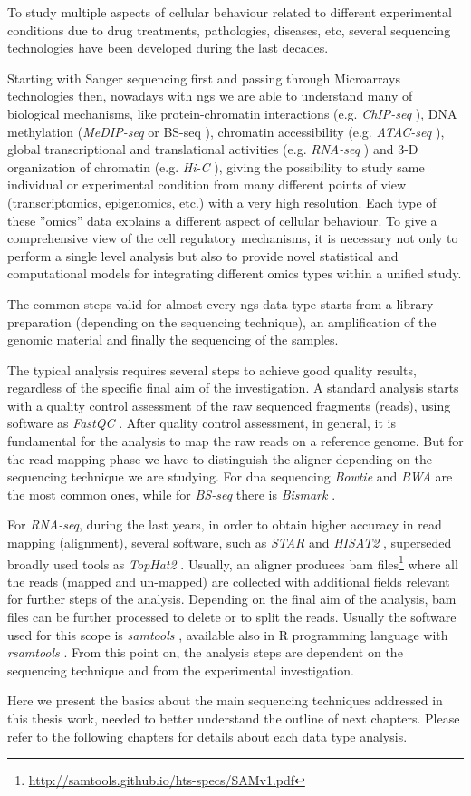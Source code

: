 To study multiple aspects of cellular behaviour related to different experimental conditions due to drug treatments, pathologies, diseases, etc, several sequencing technologies have been developed during the last decades.

Starting with Sanger sequencing first and passing through Microarrays technologies then, nowadays with \gls{ngs} we are able to understand many of biological mechanisms, like protein-chromatin interactions (e.g. \textit{ChIP-seq} \cite{Park2009}), DNA methylation (\textit{MeDIP-seq} or BS-seq \cite{Frommer1992}), chromatin accessibility (e.g. \textit{ATAC-seq} \cite{Buenrostro2013}), global transcriptional and translational activities (e.g. \textit{RNA-seq} \cite{Wang2009}) and 3-D organization of chromatin (e.g. \textit{Hi-C} \cite{VanBerkum2010}), giving the possibility to study same individual or experimental condition from many different points of view (transcriptomics, epigenomics, etc.) with a very high resolution. Each type of these ''omics'' data explains a different aspect of cellular behaviour. 
To give a comprehensive view of the cell regulatory mechanisms, it is necessary not only to perform a single level analysis but also to provide novel statistical and computational models for integrating different omics types within a unified study.

The common steps valid for almost every \gls{ngs} data type starts from a library preparation (depending on the sequencing technique), an amplification of the genomic material and finally the sequencing of the samples.

The typical analysis requires several steps to achieve good quality results, regardless of the specific final aim of the investigation.
A standard analysis starts with a quality control assessment of the raw sequenced fragments (reads), using software as \textit{FastQC} \cite{Andrews2010}.
After quality control assessment, in general, it is fundamental for the analysis to map the raw reads on a reference genome. 
But for the read mapping phase we have to distinguish the aligner depending on the sequencing technique we are studying.
For \gls{dna} sequencing \textit{Bowtie} \cite{Langmead2009, Langmead2012} and \textit{BWA} \cite{Li2010, Li2009b} are the most common ones, while for \textit{BS-seq} there is \textit{Bismark} \cite{Krueger2011}.

For \textit{RNA-seq}, during the last years, in order to obtain higher accuracy in read mapping (alignment), several software, such as \textit{STAR} \cite{Dobin2013} and \textit{HISAT2} \cite{Kim2015}, superseded broadly used tools as \textit{TopHat2} \cite{Kim2013}.
Usually, an aligner produces \gls{bam} files\footnote{\url{http://samtools.github.io/hts-specs/SAMv1.pdf}} \cite{Li2009} where all the reads (mapped and un-mapped) are collected with additional fields relevant for further steps of the analysis.
Depending on the final aim of the analysis, \gls{bam} files can be further processed to delete or to split the reads. 
Usually the software used for this scope is \textit{samtools} \cite{Li2009, Li2011}, available also in R programming language with \textit{rsamtools} \cite{Morgan}.
From this point on, the analysis steps are dependent on the sequencing technique and from the experimental investigation.

Here we present the basics about the main sequencing techniques addressed in this thesis work, needed to better understand the outline of next chapters.
Please refer to the following chapters for details about each data type analysis.